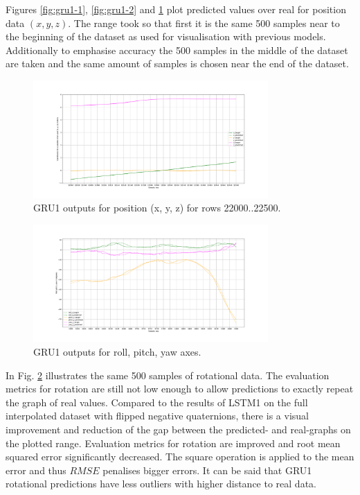 Figures \ref{fig:gru1-1},  \ref{fig:gru1-2} and \ref{fig:gru1-3} plot predicted values over real for position data $(x, y, z)$. The range took so that first it is the same 500 samples near to the beginning of the dataset as used for visualisation with previous models. Additionally to emphasise accuracy the 500 samples in the middle of the dataset are taken and the same amount of samples is chosen near the end of the dataset. 
\begin{figure}[t!]
	\begin{center}
		\includegraphics[width=0.8\textwidth, keepaspectratio]{gfx/gru1-xyz_position_21000.pdf}
		\caption{GRU1 outputs for position (x, y, z) for rows 22000..22500.}
		\label{fig:gru1-3}
	\end{center}
\end{figure}
\begin{figure}[t!]
	\begin{center}
		\includegraphics[width=0.8\textwidth, keepaspectratio]{gfx/gru1-roll_pitch_yaw_accuracy.pdf}
		\caption{GRU1 outputs for roll, pitch, yaw axes.}
		\label{fig:gru1-4}
	\end{center}
\end{figure}
In Fig. \ref{fig:gru1-4} illustrates the same 500 samples of rotational data. The evaluation metrics for rotation are still not low enough to allow predictions to exactly repeat the graph of real values. Compared to the results of LSTM1 on the full interpolated dataset with flipped negative quaternions, there is a visual improvement and reduction of the gap between the predicted- and real-graphs on the plotted range. Evaluation metrics for rotation are improved and root mean squared error significantly decreased. The square operation is applied to the mean error and thus $RMSE$ penalises bigger errors. It can be said that GRU1 rotational predictions have less outliers with higher distance to real data.

